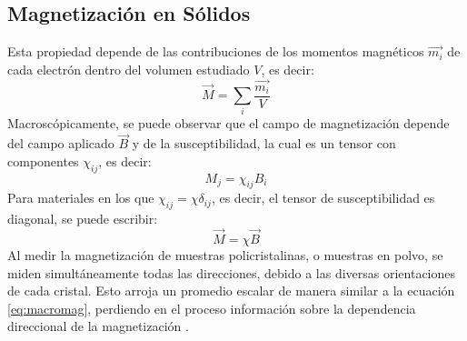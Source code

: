 \documentclass[../main.tex]{subfiles}
\begin{document}
\subsection{Magnetización en Sólidos}
Esta propiedad depende de las contribuciones de los momentos magnéticos $\vec{m_i}$ de cada electrón dentro del volumen estudiado $V$, es decir:
\begin{equation}
    \vec{M}=\sum_i\dfrac{\vec{m_i}}{V}
    \label{eq:micromag}
\end{equation}
Macroscópicamente, se puede observar que el campo de magnetización depende del campo aplicado $\vec{B}$ y de la susceptibilidad, la cual es un tensor con componentes $\chi_{ij}$, es decir:
\begin{equation}
    M_j=\chi_{ij}B_i
    \label{eq:tensormag}
\end{equation}
Para materiales en los que $\chi_{ij}=\chi\delta_{ij}$, es decir, el tensor de susceptibilidad es diagonal, se puede escribir:
\begin{equation}
    \vec{M}=\chi\vec{B}
    \label{eq:macromag}
\end{equation}
Al medir la magnetización de muestras policristalinas, o muestras en polvo, se miden simultáneamente todas las direcciones, debido a las diversas orientaciones de cada cristal. Esto arroja un promedio escalar de manera similar a la ecuación \ref{eq:macromag}, perdiendo en el proceso información sobre la dependencia direccional de la magnetización \cite{Mugiraneza2022}.
\end{document}
